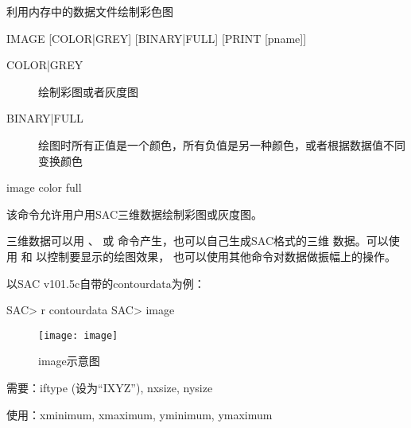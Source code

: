 \label{cmd:image}

利用内存中的数据文件绘制彩色图

\begin{SACSTX}
IMAGE [COLOR|GREY] [BINARY|FULL] [PRINT [pname]]
\end{SACSTX}

\begin{description}
\item [COLOR|GREY] 绘制彩图或者灰度图
\item [BINARY|FULL] 绘图时所有正值是一个颜色，所有负值是另一种颜色，或者根据数据值不同变换颜色
\end{description}

\begin{SACDFT}
image color full
\end{SACDFT}

该命令允许用户用SAC三维数据绘制彩图或灰度图。

三维数据可以用 、
 或  命令产生，也可以自己生成SAC格式的三维
数据。可以使用  和  以控制要显示的绘图效果，
也可以使用其他命令对数据做振幅上的操作。

以SAC v101.5c自带的contourdata为例：
\begin{SACCode}
SAC> r contourdata
SAC> image
\end{SACCode}

\begin{figure}[!ht]
\centering
\texttt{[image: image]}
\caption{image示意图}
\end{figure}

需要：iftype (设为``IXYZ''), nxsize, nysize

使用：xminimum, xmaximum, yminimum, ymaximum

